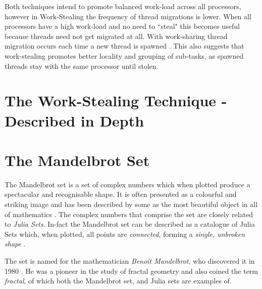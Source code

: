 Both techniques intend to promote balanced work-load across all processors, however in Work-Stealing
the frequency of thread migrations is lower. When all processors have a 
high work-load and no need to ``steal" this becomes useful because threads need not get 
migrated at all. With work-sharing thread migration occurs each time a new thread is spawned \cite[p.~2]{blumleis}.
This also suggests that work-stealing promotes better locality and grouping of sub-tasks, as spawned threads stay with the same 
processor until stolen.



\section{The Work-Stealing Technique - Described in Depth}


\section{The Mandelbrot Set}

The Mandelbrot set is a set of complex numbers which when plotted produce a spectacular and recognisable shape.
It is often presented as a colourful and striking image and has been described by some as the most beautiful object in all of mathematics \cite[p.~234]{chaosfract}.
The complex numbers that comprise the set are closely related to \textit{Julia Sets}. 
In-fact the Mandelbrot set can be described as a catalogue of Julia Sets which, when plotted, all points are \textit{connected}, 
forming a \textit{single, unbroken shape} \cite[p.~177]{fractimg}.

The set is named for the mathematician \textit{Benoit Mandelbrot}, who discovered it in 1980 \cite{fracnature}\cite{fractimg}. He was a pioneer in the study of 
fractal geometry and also coined the term \textit{fractal}, of which both the Mandelbrot set, and Julia sets are examples of. 

